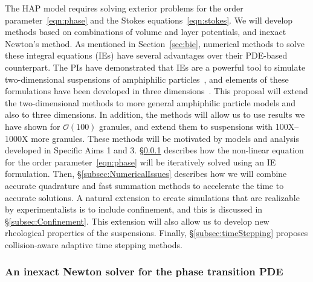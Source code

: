 The HAP model requires solving exterior problems for the order
parameter~\eqref{eqn:phase} and the Stokes equations~\eqref{eqn:stokes}.
We will develop methods based on combinations of volume and layer
potentials, and inexact Newton's method. As mentioned in
Section~\ref{sec:bie}, numerical methods to solve these integral
equations (IEs) have several advantages over their PDE-based
counterpart. The PIs have demonstrated that IEs are a powerful tool to
simulate two-dimensional suspensions of amphiphilic
particles~\cite{Fu2018_SIAM, FuQuRyYo22, fu-ryh-qua-you2022}, and
elements of these formulations have been developed in three
dimensions~\cite{ying_2006, manasthesis, rac-gre2016}. This proposal
will extend the two-dimensional methods to more general amphiphilic
particle models and also to three dimensions. In addition, the methods
will allow us to use results we have shown for $\mathcal{O}(100)$
granules, and extend them to suspensions with 100X--1000X more granules.
These methods will be motivated by models and analysis developed in
Specific Aims 1 and 3. \S\ref{subsec:AC} describes how the non-linear
equation for the order parameter~\eqref{eqn:phase} will be iteratively
solved using an IE formulation. Then, \S\ref{subsec:NumericalIssues}
describes how we will combine accurate quadrature and fast summation
methods to accelerate the time to accurate solutions. A natural
extension to create simulations that are realizable by experimentalists
is to include confinement, and this is discussed in
\S\ref{subsec:Confinement}. This extension will also allow us to develop
new rheological properties of the suspensions.  Finally,
\S\ref{subsec:timeStepping} proposes collision-aware adaptive time
stepping methods.

\subsubsection{An inexact Newton solver for the phase transition PDE}
\label{subsec:AC}

